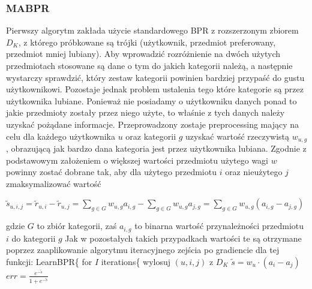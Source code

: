 \documentclass{pracamgr}
\begin{document}
    \subsubsection{MABPR}
     Pierwszy algorytm zakłada użycie standardowego BPR z rozszerzonym zbiorem $D_K$, z którego próbkowane są trójki
     (użytkownik, przedmiot preferowany, przedmiot mniej lubiany).\newline
     Aby wprowadzić rozróżnienie na dwóch użytych przedmiotach stosowane są dane o tym do jakich kategorii należą,
     a następnie wystarczy sprawdzić, który zestaw kategorii powinien bardziej przypaść do gustu użytkownikowi.
     Pozostaje jednak problem ustalenia tego które kategorie są przez użytkownika lubiane.
     Ponieważ nie posiadamy o użytkowniku danych ponad to jakie przedmioty zostały przez niego użyte, to właśnie z tych danych należy uzyskać
     pożądane informacje.
     Przeprowadzony zostaje preprocessing mający na celu dla każdego użytkownika $u$ oraz kategorii $g$ uzyskać
     wartość rzeczywistą $w_{u,g}$, obrazującą jak bardzo dana kategoria jest przez użytkownika lubiana.
     Zgodnie z podstawowym założeniem o większej wartości przedmiotu użytego wagi $w$ powinny zostać dobrane tak,
     aby dla użytego przedmiotu $i$ oraz nieużytego $j$ zmaksymalizować wartość
     \begin{center}
      $\tilde{s}_{u,i,j}=\tilde{r}_{u,i}-\tilde{r}_{u,j}=\sum\limits_{g\in G}w_{u,g}a_{i,g}-\sum\limits_{g\in G}w_{u,g}a_{j,g}
      =\sum\limits_{g\in G}w_{u,g}(a_{i,g}-a_{j,g})$
     \end{center}
     {\scriptsize
      gdzie $G$ to zbiór kategorii, zaś $a_{i,g}$ to binarna wartość przynależności przedmiotu $i$ do kategorii $g$
     }\newline
     Jak w pozostałych takich przypadkach wartości te są otrzymane poprzez zaaplikowanie algorytmu iteracyjnego zejścia po gradiencie dla tej funkcji:\newline
     \hspace*{0pt} LearnBPR\{\newline
     \hspace*{16pt}	for $I$ iterations\{\newline
     \hspace*{32pt}		wylosuj $(u,i,j)$ z $D_K$\newline 
     \hspace*{32pt}		$\tilde{s}=w_u\cdot(a_i-a_j)$\newline
     \hspace*{32pt}		$err=\frac{e^{-\tilde{s}}}{1+e^{-\tilde{s}}}$\newline
\end{document}

